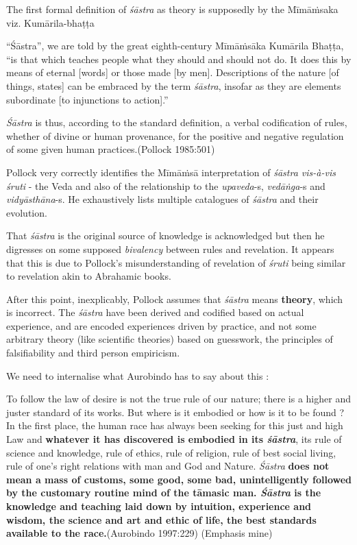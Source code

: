 The first formal definition of {\sl śāstra} as theory is supposedly by the Mīmāṁsaka viz. Kumārila-bhaṭṭa
\begin{myquote}
``Śāstra'', we are told by the great eighth-century Mīmāṁsāka Kumārila Bhaṭṭa, ``is that which teaches people what they should and should not do. It does this by means of eternal [words] or those made [by men]. Descriptions of the nature [of things, states] can be embraced by the term {\sl śāstra}, insofar as they are elements subordinate [to injunctions to action].''

{\sl Śāstra} is thus, according to the standard definition, a verbal codification of rules, whether of divine or human provenance, for the positive and negative regulation of some given human practices.\hfill (Pollock 1985:501)
\end{myquote}

Pollock very correctly identifies the Mīmāṁsā interpretation of {\sl śāstra vis-à-vis śruti} - the Veda and also of the relationship to the {\sl upaveda}-s, {\sl vedāṅga}-s and  {\sl vidyāsthāna}-s. He exhaustively lists multiple catalogues of {\sl śāstra} and their evolution.

That {\sl śāstra} is the original source of knowledge is acknowledged but then he digresses on some supposed {\sl bivalency} between rules and revelation. It appears that this is due to Pollock's misunderstanding of revelation of {\sl śruti} being similar to revelation akin to Abrahamic books.

After this point, inexplicably, Pollock assumes that {\sl śāstra} means {\bf theory}, which is incorrect. The {\sl śāstra} have been derived and codified based on actual experience, and are encoded experiences driven by practice, and not some arbitrary theory (like scientific theories) based on guesswork, the principles of falsifiability and third person empiricism.

We need to internalise what Aurobindo has to say about this :
\begin{myquote}
To follow the law of desire is not the true rule of our nature; there is a higher and juster standard of its works. But where is it embodied or how is it to be found ? In the first place, the human race has always been seeking for this just and high Law and {\bf whatever it has discovered is embodied in its {{\sl\bfseries śāstra}\relax}}, its rule of science and knowledge, rule of ethics, rule of religion, rule of best social living, rule of one's right relations with man and God and Nature. {\sl Śāstra} {\bf does not mean a mass of customs, some good, some bad, unintelligently followed by the customary routine mind of the tāmasic man. {{\sl\bfseries Śāstra}\relax} is the knowledge and teaching laid down by intuition, experience and wisdom, the science and art and ethic of life, the best standards available to the race.}\hfill (Aurobindo 1997:229) (Emphasis mine)
\end{myquote}

